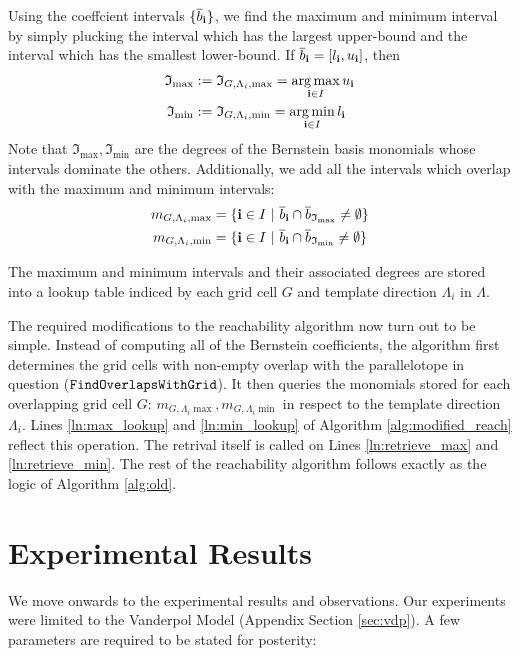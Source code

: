 \begin{enumerate}
 Using the coeffcient intervals $\{\overline{b}_{{\bf i}}\}$, we find the maximum and minimum interval by simply plucking the interval which has the largest upper-bound and the interval which has the smallest lower-bound. If $\overline{b}_{{\bf i}} = [l_{\bf i}, u_{\bf i}]$, then
%
\begin{align}
  \mathfrak{I}_{\max} & := \mathfrak{I}_{G,\Lambda_i, \max}  = \operatorname*{arg\,max}_{{\bf i} \in I} u_{\bf i} \\
  \mathfrak{I}_{\min} & := \mathfrak{I}_{G,\Lambda_i, \min} = \operatorname*{arg\,min}_{{\bf i} \in I} l_{\bf i}
\end{align}
%
Note that $\mathfrak{I}_{\max}, \mathfrak{I}_{\min}$ are the degrees of the Bernstein basis monomials whose intervals dominate the others. Additionally, we add all the intervals which overlap with the maximum and minimum intervals:
%
\begin{align}
  \begin{split}
      m_{G,\Lambda_i,\max} & = \{{\bf i} \in I ~|~ \overline{b}_{{\bf i}} \cap \overline{b}_{\mathfrak{I}_{\max}} \neq \emptyset \}\\
      m_{G,\Lambda_i,\min} & = \{{\bf i} \in I ~|~ \overline{b}_{{\bf i}} \cap \overline{b}_{\mathfrak{I}_{\min}} \neq \emptyset \}
  \end{split}
\end{align}

 The maximum and minimum intervals and their associated degrees are stored into a lookup table indiced by each grid cell $G$ and template direction $\Lambda_i$ in $\Lambda$.
\end{enumerate}

The required modifications to the reachability algorithm now turn out to be simple.
%
Instead of computing all of the Bernstein coefficients, the algorithm first determines the grid cells with non-empty overlap with the parallelotope in question ($\texttt{FindOverlapsWithGrid}$). It then queries the monomials stored for each overlapping grid cell $G$: $ m_{G,\Lambda_i\max}, m_{G,\Lambda_i \min}$ in respect to the template direction $\Lambda_i$. Lines \ref{ln:max_lookup} and \ref{ln:min_lookup} of Algorithm \ref{alg:modified_reach} reflect this operation. The retrival itself is called on Lines \ref{ln:retrieve_max} and \ref{ln:retrieve_min}. The rest of the reachability algorithm follows exactly as the logic of Algorithm \ref{alg:old}.

\section{Experimental Results}
We move onwards to the experimental results and observations. Our experiments were limited to the Vanderpol Model (Appendix Section \ref{sec:vdp}). A few parameters are required to be stated for posterity:

